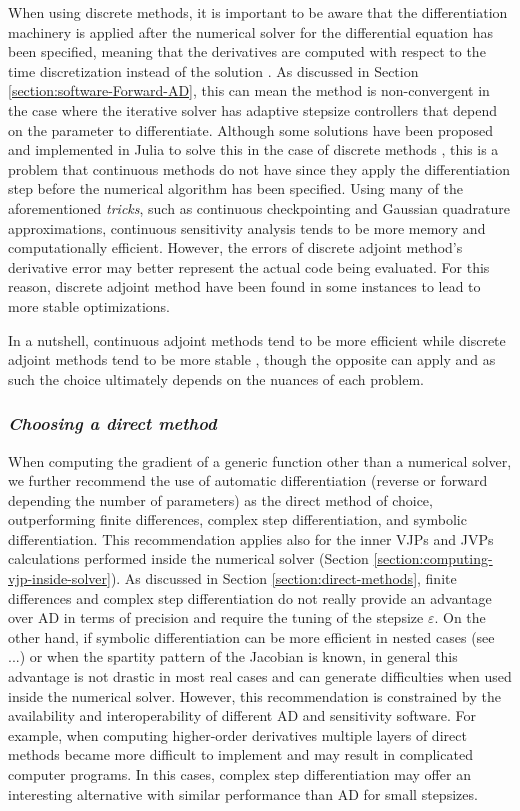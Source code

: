 When using discrete methods, it is important to be aware that the differentiation machinery is applied after the numerical solver for the differential equation has been specified, meaning that the derivatives are computed with respect to the time discretization instead of the solution \cite{Eberhard_Bischof_1996}.
As discussed in Section \ref{section:software-Forward-AD}, this can mean the method is non-convergent in the case where the iterative solver has adaptive stepsize controllers that depend on the parameter to differentiate.
Although some solutions have been proposed and implemented in Julia to solve this in the case of discrete methods \cite{Eberhard_Bischof_1996}, this is a problem that continuous methods do not have since they apply the differentiation step before the numerical algorithm has been specified. 
Using many of the aforementioned \emph{tricks}, such as continuous checkpointing and Gaussian quadrature approximations, continuous sensitivity analysis tends to be more memory and computationally efficient. 
However, the errors of discrete adjoint method's derivative error may better represent the actual code being evaluated. 
For this reason, discrete adjoint method have been found in some instances to lead to more stable optimizations. 

In a nutshell, continuous adjoint methods tend to be more efficient while discrete adjoint methods tend to be more stable \cite{rackauckas2020universal}, though the opposite can apply and as such the choice ultimately depends on the nuances of each problem.


\subsubsection*{\textit{Choosing a direct method}}

When computing the gradient of a generic function other than a numerical solver, we further recommend the use of automatic differentiation (reverse or forward depending the number of parameters) as the direct method of choice, outperforming finite differences, complex step differentiation, and symbolic differentiation. 
This recommendation applies also for the inner VJPs and JVPs calculations performed inside the numerical solver (Section \ref{section:computing-vjp-inside-solver}).
As discussed in Section \ref{section:direct-methods}, finite differences and complex step differentiation do not really provide an advantage over AD in terms of precision and require the tuning of the stepsize $\varepsilon$. 
On the other hand, if symbolic differentiation can be more efficient in nested cases (see ...) or when the spartity pattern of the Jacobian is known, in general this advantage is not drastic in most real cases and can generate difficulties when used inside the numerical solver. 
However, this recommendation is constrained by the availability and interoperability of different AD and sensitivity software. 
For example, when computing higher-order derivatives multiple layers of direct methods became more difficult to implement and may result in complicated computer programs.
In this cases, complex step differentiation may offer an interesting alternative with similar performance than AD for small stepsizes. 

